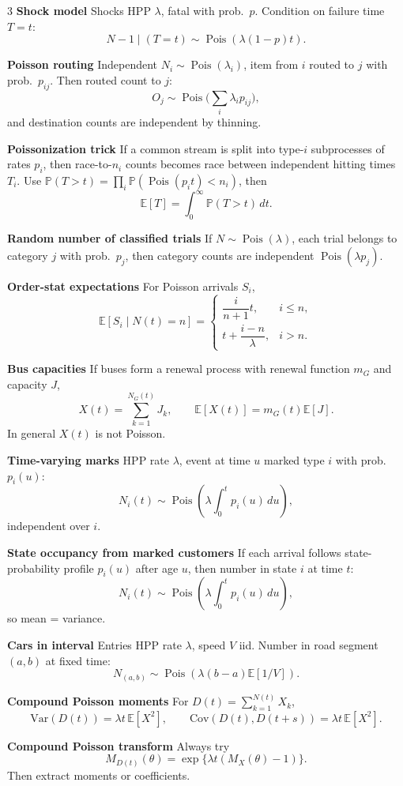\documentclass[a4paper,8pt,fleqn]{extarticle}
\newcommand{\E}{\mathbb{E}}
\newcommand{\PP}{\mathbb{P}}
\newcommand{\Var}{\mathrm{Var}}
\newcommand{\Cov}{\mathrm{Cov}}
\newcommand{\1}{\mathbf{1}}
\newcommand{\sub}[1]{\textbf{#1} }
\DeclareMathOperator{\Pois}{Pois}
\begin{document}
\begin{multicols}{3}
\sub{Shock model} Shocks HPP \(\lambda\), fatal with prob.\ \(p\). Condition on failure time \(T=t\):
\[
N-1\mid (T=t)\sim \Pois(\lambda(1-p)t).
\]

\sub{Poisson routing} Independent \(N_i\sim \Pois(\lambda_i)\), item from \(i\) routed to \(j\) with prob.\ \(p_{ij}\). Then routed count to \(j\):
\[
O_j\sim \Pois\Big(\sum_i \lambda_i p_{ij}\Big),
\]
and destination counts are independent by thinning.

\sub{Poissonization trick} If a common stream is split into type-\(i\) subprocesses of rates \(p_i\), then race-to-\(n_i\) counts becomes race between independent hitting times \(T_i\). Use \(\PP(T>\!t)=\prod_i\PP(\Pois(p_it)<n_i)\), then
\[
\E[T]=\int_0^\infty \PP(T>t)\,dt.
\]

\sub{Random number of classified trials} If \(N\sim \Pois(\lambda)\), each trial belongs to category \(j\) with prob.\ \(p_j\), then category counts are independent \(\Pois(\lambda p_j)\).

\sub{Order-stat expectations} For Poisson arrivals \(S_i\),
\[
\E[S_i\mid N(t)=n]=
\begin{cases}
\dfrac{i}{n+1}t,&i\le n,\\[0.6ex]
t+\dfrac{i-n}{\lambda},&i>n.
\end{cases}
\]

\sub{Bus capacities} If buses form a renewal process with renewal function \(m_G\) and capacity \(J\),
\[
X(t)=\sum_{k=1}^{N_G(t)}J_k,\qquad \E[X(t)]=m_G(t)\E[J].
\]
In general \(X(t)\) is not Poisson.

\sub{Time-varying marks} HPP rate \(\lambda\), event at time \(u\) marked type \(i\) with prob.\ \(p_i(u)\):
\[
N_i(t)\sim \Pois\!\left(\lambda\int_0^t p_i(u)\,du\right),
\]
independent over \(i\).

\sub{State occupancy from marked customers} If each arrival follows state-probability profile \(p_i(u)\) after age \(u\), then number in state \(i\) at time \(t\):
\[
N_i(t)\sim \Pois\!\left(\lambda\int_0^t p_i(u)\,du\right),
\]
so mean = variance.

\sub{Cars in interval} Entries HPP rate \(\lambda\), speed \(V\) iid. Number in road segment \((a,b)\) at fixed time:
\[
N_{(a,b)}\sim \Pois\!\left(\lambda(b-a)\E[1/V]\right).
\]

\sub{Compound Poisson moments} For \(D(t)=\sum_{k=1}^{N(t)}X_k\),
\[
\Var(D(t))=\lambda t\,\E[X^2],\qquad
\Cov(D(t),D(t+s))=\lambda t\,\E[X^2].
\]

\sub{Compound Poisson transform} Always try
\[
M_{D(t)}(\theta)=\exp\{\lambda t(M_X(\theta)-1)\}.
\]
Then extract moments or coefficients.


\end{multicols}
\end{document}
